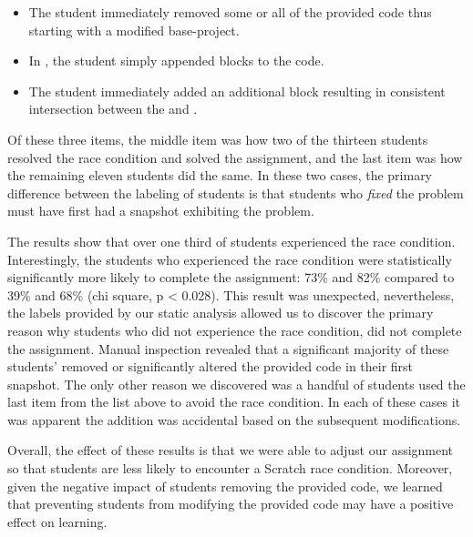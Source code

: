 \begin{itemize}
\item The student immediately removed some or all of the provided code thus
  starting with a modified base-project.
\item In \stwo{}, the student simply appended \glideto{} blocks to the code.
\item The student immediately added an additional \glideDIST{} block resulting
  in consistent intersection between the \net{} and \zebra{}.
\end{itemize}

Of these three items, the middle item was how two of the thirteen students
resolved the race condition and solved the assignment, and the last item was
how the remaining eleven students did the same. In these two cases, the primary
difference between the labeling of students is that students who \emph{fixed}
the problem must have first had a snapshot exhibiting the problem.

The results show that over one third of students experienced the race
condition. Interestingly, the students who experienced the race condition were
statistically significantly more likely to complete the assignment: 73\% and
82\% compared to 39\% and 68\% (chi square, p < 0.028). This result was
unexpected, nevertheless, the labels provided by our static analysis allowed us
to discover the primary reason why students who did not experience the race
condition, did not complete the assignment. Manual inspection revealed that a
significant majority of these students' removed or significantly altered the
provided code in their first snapshot. The only other reason we discovered was
a handful of students used the last item from the list above to avoid the race
condition. In each of these cases it was apparent the addition was accidental
based on the subsequent modifications.

Overall, the effect of these results is that we were able to adjust our
assignment so that students are less likely to encounter a Scratch race
condition. Moreover, given the negative impact of students removing the
provided code, we learned that preventing students from modifying the provided
code may have a positive effect on learning.

